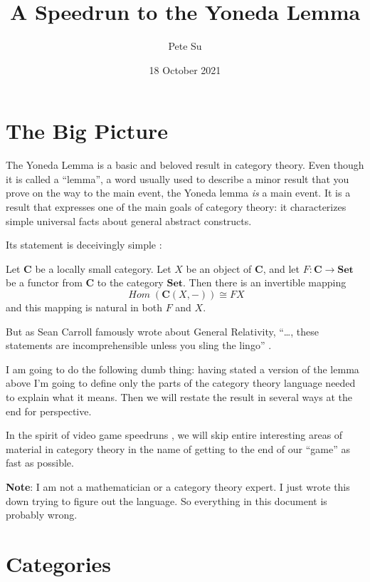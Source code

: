 \documentclass[12pt]{article}
\theoremstyle{definition}
\theoremstyle{definition}
\theoremstyle{definition}
\numberwithin{equation}{section}
\newcommand{\cat}[1]{\mathbf{#1}}      %
\newcommand{\fcat}[1]{{\mathbf {#1}}}    %
\newcommand{\CC}{\cat{C}}
\DeclareMathOperator{\Hom}{\mathit{Hom}}
\newcommand{\Set}{\fcat{Set}}           %
\newcommand{\iso}{\cong}                %
\def\pg{\bigskip\goodbreak
\ni}
\def\ni{\goodbreak\noindent}
\begin{document}
\title{\Large A Speedrun to the Yoneda Lemma}
\author{\large Pete Su}
\date{\large 18 October 2021}

\maketitle


\section{The Big Picture}

The Yoneda Lemma is a basic and beloved result in category theory. Even though it is called
a ``lemma'', a word usually used to describe a minor result that you prove on the way
to the main event, the Yoneda lemma {\it is} a main event. It is a result that expresses
one of the main goals of category theory: it characterizes simple universal facts
about general abstract constructs.

Its statement is deceivingly simple \cite{Rhiel2016}:

\pg
Let $\CC$ be a locally small category. Let $X$ be an
object of $\CC$, and let $F: \CC \to \Set$ be a functor from $\CC$ to the category $\Set$.
Then there is an invertible mapping
$$
\Hom(\CC(X, -)) \iso FX
$$
and this mapping is natural in both $F$ and $X$.

\pg
But as Sean Carroll famously wrote about General Relativity, ``\dots, 
these statements are incomprehensible unless you sling the lingo'' \cite{carroll}.

I am going to do the following dumb thing: having stated a version of the lemma above
I'm going to define only the parts of the category theory language 
needed to explain what it means.
Then we will restate the result in several ways at the end for perspective.

In the spirit of video game speedruns \cite{lobos},
we will skip entire interesting areas of material in category theory in the name of
getting to the end of our ``game'' as fast as possible.

\pg
{\bf Note}: I am not a mathematician or a category theory expert. I just wrote this
down trying to figure out the language.
So everything in this document is probably wrong.

\goodbreak
\section{Categories}
\end{document}
